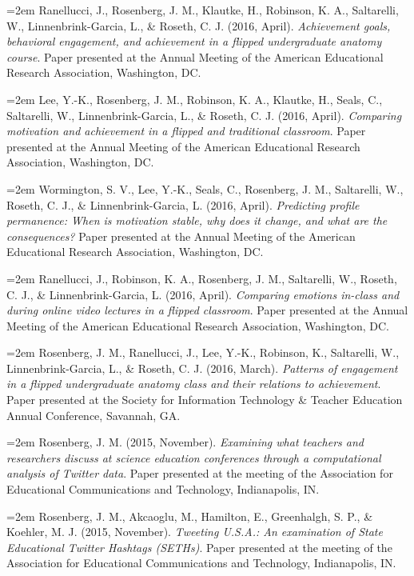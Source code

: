 \documentclass[14,]{article}
\begin{document}
\hangindent=2em Ranellucci, J., Rosenberg, J. M., Klautke, H., Robinson,
K. A., Saltarelli, W., Linnenbrink-Garcia, L., \& Roseth, C. J. (2016,
April). \emph{Achievement goals, behavioral engagement, and achievement
in a flipped undergraduate anatomy course}. Paper presented at the
Annual Meeting of the American Educational Research Association,
Washington, DC.

\hangindent=2em Lee, Y.-K., Rosenberg, J. M., Robinson, K. A., Klautke,
H., Seals, C., Saltarelli, W., Linnenbrink-Garcia, L., \& Roseth, C. J.
(2016, April). \emph{Comparing motivation and achievement in a flipped
and traditional classroom}. Paper presented at the Annual Meeting of the
American Educational Research Association, Washington, DC.

\hangindent=2em Wormington, S. V., Lee, Y.-K., Seals, C., Rosenberg, J.
M., Saltarelli, W., Roseth, C. J., \& Linnenbrink-Garcia, L. (2016,
April). \emph{Predicting profile permanence: When is motivation stable,
why does it change, and what are the consequences?} Paper presented at
the Annual Meeting of the American Educational Research Association,
Washington, DC.

\hangindent=2em Ranellucci, J., Robinson, K. A., Rosenberg, J. M.,
Saltarelli, W., Roseth, C. J., \& Linnenbrink-Garcia, L. (2016, April).
\emph{Comparing emotions in-class and during online video lectures in a
flipped classroom}. Paper presented at the Annual Meeting of the
American Educational Research Association, Washington, DC.

\hangindent=2em Rosenberg, J. M., Ranellucci, J., Lee, Y.-K., Robinson,
K., Saltarelli, W., Linnenbrink-Garcia, L., \& Roseth, C. J. (2016,
March). \emph{Patterns of engagement in a flipped undergraduate anatomy
class and their relations to achievement}. Paper presented at the
Society for Information Technology \& Teacher Education Annual
Conference, Savannah, GA.

\hangindent=2em Rosenberg, J. M. (2015, November). \emph{Examining what
teachers and researchers discuss at science education conferences
through a computational analysis of Twitter data}. Paper presented at
the meeting of the Association for Educational Communications and
Technology, Indianapolis, IN.

\hangindent=2em Rosenberg, J. M., Akcaoglu, M., Hamilton, E.,
Greenhalgh, S. P., \& Koehler, M. J. (2015, November). \emph{Tweeting
U.S.A.: An examination of State Educational Twitter Hashtags (SETHs)}.
Paper presented at the meeting of the Association for Educational
Communications and Technology, Indianapolis, IN.
\end{document}
